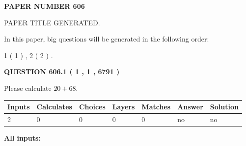 \documentclass[12pt]{article}
\begin{document}
   
   
   
\newpage 
\setcounter{page}{ 
   606001 } 
   
   
   
   
 {\textbf{ \Large{ PAPER NUMBER  606  }}}
   
   
\vspace{0.2in}
   
   
   
   
   
   
   
   
 \vspace{0.2in}
 
 
 
 
   
   
 PAPER TITLE GENERATED.
   
   
   
\vspace{0.2in}
   
In this paper, big questions will be generated in the following order: 
   
   
   1 ( 1 )
 ,
   2 ( 2 )
 .
  
\vspace{0.2in}
  
{\textbf{\Large{QUESTION
606.1 
 ( 1 , 1 , 6791 )
}}}
  
  
 
Please calculate $ %
20 +  %
68 $.
 
 
   
   
   
   
\noindent\begin{tabular}{|l|l|l|l|l|l|l|}
 \hline
Inputs & Calculates & Choices & Layers & Matches & Answer & Solution \\ \hline
 2  & 
 0  & 
 0
  & 
 0  & 
 0  & 
  no & 
  no 
  \\ \hline
 \end{tabular}
   
   
   
   
\noindent{}
   
   
   
   
\noindent\vspace{0.1in}\hspace{-0.08in} {\textbf{\Large{All inputs: }}}
   
   
  
\end{document}
